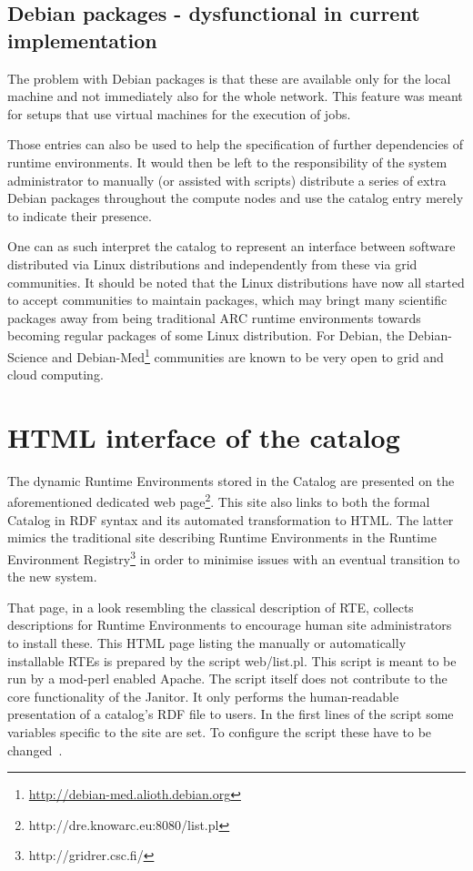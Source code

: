 \subsection{Debian packages - dysfunctional in current implementation}

The problem with Debian packages is that these are available only for the
local machine and not immediately also for the whole network. This feature
was meant for setups that use virtual machines for the execution of jobs.

Those entries can also be used to help the specification of further
dependencies of runtime environments. It would then be left to the
responsibility of the system administrator to manually (or assisted with
scripts) distribute a series of extra Debian packages throughout the
compute nodes and use the catalog entry merely to indicate their presence.

One can as such interpret the catalog to represent an interface between
software distributed via Linux distributions and independently from these
via grid communities. It should be noted that the Linux distributions
have now all started to accept communities to maintain packages, which
may bringt many scientific packages away from being traditional ARC 
runtime environments towards becoming regular packages of some Linux
distribution. For Debian, the Debian-Science and
Debian-Med\footnote{\href{http://debian-med.alioth.debian.org}{http://debian-med.alioth.debian.org}}
communities are known to be very open to grid and cloud computing.

\section{HTML interface of the catalog}

The dynamic Runtime Environments stored in the
Catalog are presented on the aforementioned dedicated web
page\footnote{http://dre.knowarc.eu:8080/list.pl}. This site also
links to both the formal Catalog in RDF syntax and its automated
transformation to HTML. The latter mimics the traditional
site describing Runtime Environments in the Runtime Environment
Registry\footnote{http://gridrer.csc.fi/} in order to minimise issues
with an eventual transition to the new system.

That page, in a look resembling the classical description of RTE,
collects descriptions for Runtime Environments to encourage human site
administrators to install these.  This HTML page listing the manually or
automatically installable RTEs is prepared by the script web/list.pl.
This script is meant to be run by a mod-perl enabled Apache. The
script itself does not contribute to the core functionality of the
Janitor. It only performs the human-readable presentation of a catalog's
RDF file to users. In the first lines of the script some variables
specific to the site are set. To configure the script these have to be
changed~\cite[p. 9]{BAYER_2007}.

